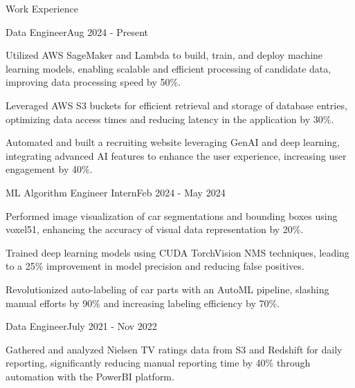 \documentclass{resume} %
\begin{document}
    \begin{rSection}{Work Experience}
                    \begin{rSubsection}
                {Data Engineer}{Aug 2024 - Present}
                                    {}
                                {}
                                    \item Utilized AWS SageMaker and Lambda to build, train, and deploy machine learning models, enabling scalable and efficient processing of candidate data, improving data processing speed by 50\%.
                                    \item Leveraged AWS S3 buckets for efficient retrieval and storage of database entries, optimizing data access times and reducing latency in the application by 30\%.
                                    \item Automated and built a recruiting website leveraging GenAI and deep learning, integrating advanced AI features to enhance the user experience, increasing user engagement by 40\%.
                            \end{rSubsection}
                    \begin{rSubsection}
                {ML Algorithm Engineer Intern}{Feb 2024 - May 2024}
                                    {}
                                {}
                                    \item Performed image visualization of car segmentations and bounding boxes using voxel51, enhancing the accuracy of visual data representation by 20\%.
                                    \item Trained deep learning models using CUDA TorchVision NMS techniques, leading to a 25\% improvement in model precision and reducing false positives.
                                    \item Revolutionized auto{-}labeling of car parts with an AutoML pipeline, slashing manual efforts by 90\% and increasing labeling efficiency by 70\%.
                            \end{rSubsection}
                    \begin{rSubsection}
                {Data Engineer}{July 2021 - Nov 2022}
                                    {}
                                {}
                                    \item Gathered and analyzed Nielsen TV ratings data from S3 and Redshift for daily reporting, significantly reducing manual reporting time by 40\% through automation with the PowerBI platform.

\end{rSubsection}
\end{rSection}
\end{document}

